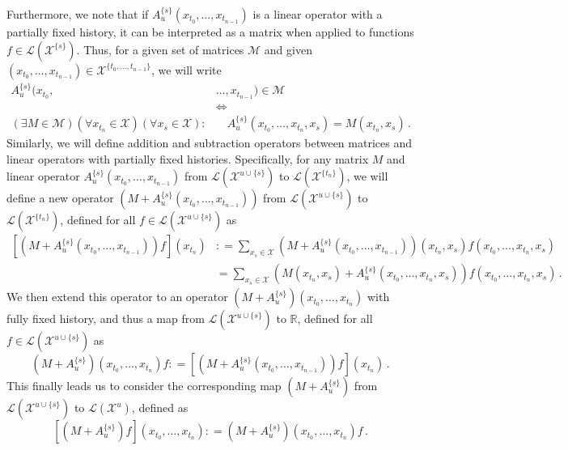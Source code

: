 \documentclass[a4paper,reqno]{amsart}
\newcommand{\states}{\mathcal{X}}
\newcommand{\gambles}{\mathcal{L}}
\newcommand{\coloneqq}{:\!=}
\begin{document}
Furthermore, we note that if $A_u^{\{s\}}(x_{t_0},\ldots,x_{t_{n-1}})$ is a linear operator with a partially fixed history, it can be interpreted as a matrix when applied to functions $f\in\gambles(\states^{\{s\}})$. Thus, for a given set of matrices $\mathcal{M}$ and given $(x_{t_0},\ldots,x_{t_{n-1}})\in\states^{\{t_0,\ldots,t_{n-1}\}}$, we will write
\begin{align*}
A_u^{\{s\}}(x_{t_0},&\ldots,x_{t_{n-1}})\in\mathcal{M} \\
&\Leftrightarrow \\
(\exists M\in\mathcal{M})(\forall x_{t_n}\in\states)(\forall x_s\in\states): &\quad A_u^{\{s\}}(x_{t_0},\ldots,x_{t_n},x_s) = M(x_{t_n},x_s)\,.
\end{align*}
Similarly, we will define addition and subtraction operators between matrices and linear operators with partially fixed histories. Specifically, for any matrix $M$ and linear operator $A_u^{\{s\}}(x_{t_0},\ldots,x_{t_{n-1}})$ from $\gambles(\states^{u\cup\{s\}})$ to $\gambles(\states^{\{t_n\}})$, we will define a new operator $\left(M + A_u^{\{s\}}(x_{t_0},\ldots,x_{t_{n-1}})\right)$ from $\gambles(\states^{u\cup\{s\}})$ to $\gambles(\states^{\{t_n\}})$, defined for all $f\in\gambles(\states^{u\cup\{s\}})$ as
\begin{align*}
\left[\left(M + A_u^{\{s\}}(x_{t_0},\ldots,x_{t_{n-1}})\right)f\right](x_{t_n}) &\coloneqq \sum_{x_s\in\states} \left(M + A_u^{\{s\}}(x_{t_0},\ldots,x_{t_{n-1}})\right)(x_{t_n},x_s) f(x_{t_0},\ldots,x_{t_n},x_s) \\
 &= \sum_{x_s\in\states} \left(M(x_{t_n},x_s) + A_u^{\{s\}}(x_{t_0},\ldots,x_{t_n},x_s)\right)f(x_{t_0},\ldots,x_{t_n},x_s)\,.
\end{align*}
We then extend this operator to an operator $\left(M + A_u^{\{s\}}\right)(x_{t_0},\ldots,x_{t_n})$ with fully fixed history, and thus a map from $\gambles(\states^{u\cup\{s\}})$ to $\mathbb{R}$, defined for all $f\in\gambles(\states^{u\cup\{s\}})$ as
\begin{equation*}
\left(M + A_u^{\{s\}}\right)(x_{t_0},\ldots,x_{t_n})f \coloneqq \left[\left(M + A_u^{\{s\}}(x_{t_0},\ldots,x_{t_{n-1}})\right)f\right](x_{t_n})\,.
\end{equation*}
This finally leads us to consider the corresponding map $\left(M + A_u^{\{s\}}\right)$ from $\gambles(\states^{u\cup\{s\}})$ to $\gambles(\states^u)$, defined as
\begin{equation*}
\left[\left(M + A_u^{\{s\}}\right)f\right](x_{t_0},\ldots,x_{t_n}) \coloneqq \left(M + A_u^{\{s\}}\right)(x_{t_0},\ldots,x_{t_n})f\,.
\end{equation*}
\end{document}
